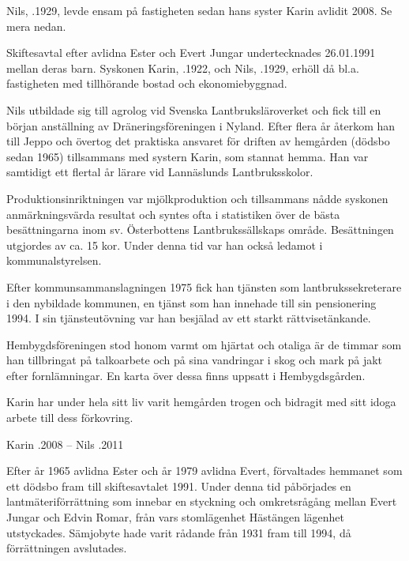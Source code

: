 
Nils, .1929, levde ensam på fastigheten sedan hans syster Karin avlidit 2008. Se mera nedan.


Skiftesavtal efter avlidna Ester och Evert Jungar undertecknades 26.01.1991 mellan deras barn. Syskonen Karin, .1922, och Nils, .1929, erhöll då bl.a. fastigheten med tillhörande bostad och ekonomiebyggnad.

Nils utbildade sig till agrolog vid Svenska Lantbruksläroverket och fick till en början anställning av Dräneringsföreningen i Nyland. Efter flera år återkom han till Jeppo och övertog det praktiska ansvaret för driften av hemgården (dödsbo sedan 1965) tillsammans med systern Karin, som stannat hemma. Han var samtidigt ett flertal år lärare vid Lannäslunds Lantbruksskolor.

Produktionsinriktningen var mjölkproduktion och tillsammans nådde syskonen anmärkningsvärda resultat och syntes ofta i statistiken över de bästa besättningarna inom sv. Österbottens Lantbrukssällskaps område. Besättningen utgjordes av ca. 15 kor. Under denna tid var han också ledamot i kommunalstyrelsen.

Efter kommunsammanslagningen 1975 fick han tjänsten som lantbrukssekreterare i den nybildade kommunen, en tjänst som han innehade till sin pensionering 1994. I sin tjänsteutövning var han besjälad av ett starkt rättvisetänkande.

Hembygdsföreningen stod honom varmt om hjärtat och otaliga är de timmar som han tillbringat på talkoarbete och på sina vandringar i skog och mark på jakt efter fornlämningar. En karta över dessa finns uppsatt i Hembygdsgården.

Karin har under hela sitt liv varit hemgården trogen och bidragit med sitt idoga arbete till dess förkovring.

Karin .2008  --  Nils .2011


Efter år 1965 avlidna Ester och år 1979 avlidna Evert, förvaltades hemmanet som ett dödsbo fram till skiftesavtalet 1991. Under denna tid påbörjades en lantmäteriförrättning som innebar en styckning och omkretsrågång mellan Evert Jungar och Edvin Romar, från vars stomlägenhet Hästängen lägenhet utstyckades. Sämjobyte hade varit rådande från 1931 fram till 1994, då förrättningen avslutades.


